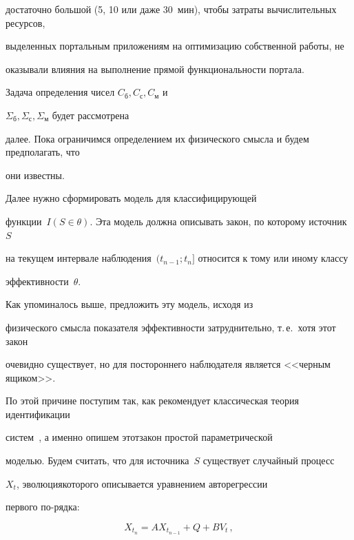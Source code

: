 достаточно большой (5, 10 или даже 30~мин), чтобы затраты вычислительных ресурсов, 


выделенных портальным приложениям на оптимизацию собственной работы, не 


оказывали влияния на выполнение прямой функциональности портала.


      


      Задача определения чисел $C_{\mathrm{б}}, C_{\mathrm{с}}, C_{\mathrm{м}}$ и 


$\Sigma_{\mathrm{б}}, \Sigma_{\mathrm{с}}, \Sigma_{\mathrm{м}}$ будет рассмотрена 


далее. Пока ограничимся определением их физического смысла и будем предполагать, что 


они известны.


      


      Далее нужно сформировать модель для классифицирующей 


функции~$I(S\in\theta)$. Эта модель должна описывать закон, по которому источник~$S$ 


на текущем интервале наблюдения~$(t_{n-1};t_n]$ относится к тому или иному классу 


эффективности~$\theta$. 




Как упоминалось выше, предложить эту модель, исходя из 


физического смысла показателя эффективности затруднительно, т.\,е.\ хотя этот закон 


очевидно существует, но для постороннего наблюдателя является <<черным ящиком>>. 





По этой причине поступим так, как рекомендует классическая теория идентификации 


систем~\cite{5-8}, а именно опишем этот\linebreak закон простой параметрической 


моделью. Будем считать, что для источника~$S$ существует случайный процесс 


$X_t$,  эволюция\linebreak которого описывается уравнением авторегрессии 


первого по-\linebreak рядка:


      \begin{equation}


      X_{t_n} =AX_{t_{n-1}}+Q+BV_t\,,


\label{e2-8}


\end{equation}


